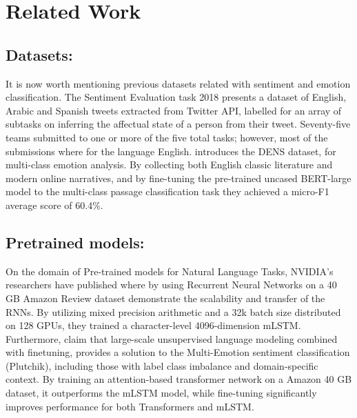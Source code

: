 \documentclass[11pt]{article}
\begin{document}
\section{Related Work}
\label{sec:related}
\subsection{Datasets:}
It is now worth mentioning previous datasets related with sentiment and emotion classification. The Sentiment Evaluation task 2018 \cite{mohammad-etal-2018-semeval} presents a dataset of English, Arabic and Spanish tweets extracted from Twitter API, labelled for an array of subtasks on inferring the affectual state of a person from their tweet. Seventy-five teams submitted to one or more of the five total tasks; however, most of the submissions where for the language English. 
\cite{liu2019dens} introduces the DENS dataset, for multi-class emotion analysis. By collecting both English classic literature and modern online narratives, and by fine-tuning the pre-trained uncased BERT-large model to the multi-class passage classification task they achieved a micro-F1 average score of 60.4\%.

\subsection{Pretrained models:}
On the domain of Pre-trained models for Natural Language Tasks, NVIDIA's researchers have published 
\cite{puri2018large} where by using Recurrent Neural Networks on a 40 GB Amazon Review dataset demonstrate 
the scalability and transfer of the RNNs. By utilizing mixed precision arithmetic and 
a 32k batch size distributed on 128 GPUs, they trained a character-level 4096-dimension mLSTM.
Furthermore, \cite{kant2018practical} claim that large-scale unsupervised language modeling combined 
with finetuning, provides a solution to the Multi-Emotion sentiment classification (Plutchik),
including those with label class imbalance and domain-specific context. By training an attention-based
transformer network on a Amazon 40 GB dataset, it outperforms the mLSTM model, while fine-tuning significantly 
improves performance for both Transformers and mLSTM.

\end{document}
